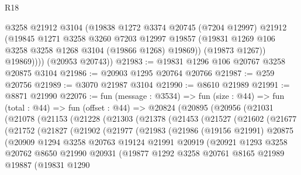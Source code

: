 \begin{lexlean}{R18}
\begin{coremodule}
              @3258
              @21912
              @3104
              (@19838
                @1272
                @3374
                @20745
                (@7204 @12997)
                @21912
                (@19845
                  @1271
                  @3258
                  @3260
                  @7203
                  @12997
                  @19857
                  (@19831 @1269 @106 @3258 @3258 @1268 @3104 (@19866 @1268) @19869))
                (@19873 @1267))
              @19869))))
      (@20953 @20743))
@21983 := @19831 @1296 @106 @20767 @3258 @20875 @3104
@21986 := @20903 @1295 @20764 @20766
@21987 := @259 @20756
@21989 := @3070 @21987 @3104
@21990 := @8610 @21989
@21991 := @8871 @21990
@22076 := fun (message : @3534) =>
  fun (size : @44) =>
  fun (total : @44) =>
  fun (offset : @44) =>
  @20824
    (@20895
      (@20956
        (@21031
          (@21078
            (@21153
              (@21228
                (@21303
                  (@21378
                    (@21453
                      (@21527
                        (@21602
                          (@21677
                            (@21752
                              (@21827
                                (@21902
                                  (@21977
                                    (@21983
                                      (@21986
                                        (@19156 @21991)
                                        @20875
                                        (@20909
                                          @1294
                                          @3258
                                          @20763
                                          @19124
                                          @21991
                                          @20919
                                          (@20921
                                            @1293
                                            @3258
                                            @20762
                                            @8650
                                            @21990
                                            @20931
                                            (@19877
                                              @1292
                                              @3258
                                              @20761
                                              @8165
                                              @21989
                                              @19887
                                              (@19831
                                                @1290

\end{coremodule}
\end{lexlean}
